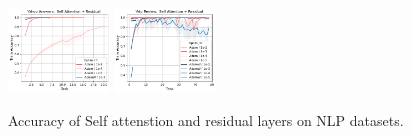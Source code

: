 \begin{figure}[t]
{    \includegraphics[width=0.24\textwidth]{figs/Accuracy/nlp/attention_residual/yahoo_answers_40.pdf}
    \includegraphics[width=0.24\textwidth]{figs/Accuracy/nlp/attention_residual/yelp_review_full_40.pdf}
    }
    \caption{Accuracy of Self attenstion and residual layers on NLP datasets.}
    \label{fig:nlp_self_res}
\end{figure}




